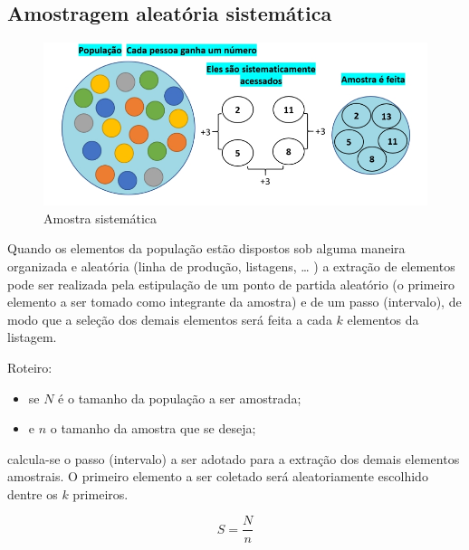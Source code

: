 \documentclass[
]{book}
\providecommand{\tightlist}{%
  \setlength{\itemsep}{0pt}\setlength{\parskip}{0pt}}
\begin{document}
\hypertarget{amostragem-aleatuxf3ria-sistemuxe1tica}{%
\subsection{Amostragem aleatória sistemática}\label{amostragem-aleatuxf3ria-sistemuxe1tica}}

\hfill\break

\begin{figure}

{\centering \includegraphics[width=0.8\linewidth]{images7/sistematica} 

}

\caption{Amostra sistemática}\label{fig:fig04}
\end{figure}

\hfill\break

Quando os elementos da população estão dispostos sob alguma maneira organizada e aleatória (linha de produção, listagens, \ldots{} ) a extração de elementos pode ser realizada pela estipulação de um ponto de partida aleatório (o primeiro elemento a ser tomado como integrante da amostra) e de um passo (intervalo), de modo que a seleção dos demais elementos será feita a cada \(k\) elementos da listagem.

\hfill\break

Roteiro:

\begin{itemize}
\tightlist
\item
  se \(N\) é o tamanho da população a ser amostrada;
\item
  e \(n\) o tamanho da amostra que se deseja;
\end{itemize}

calcula-se o passo (intervalo) a ser adotado para a extração dos demais elementos amostrais. O primeiro elemento a ser coletado será aleatoriamente escolhido dentre os \(k\) primeiros.

\hfill\break

\[
S=\frac{N}{n}
\]

\hfill\break
\end{document}
